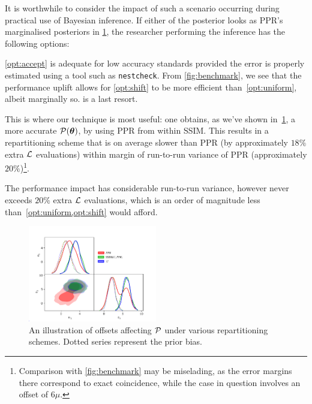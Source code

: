 \documentclass[usenatbib]{mnras}
\begin{document}
It is worthwhile to consider the impact of such a scenario occurring
during practical use of Bayesian inference. If either of the posterior
looks as PPR's marginalised posteriors in \cref{fig:convergence}, the
researcher performing the inference has the following options:
\vref{opt:accept} is adequate for low accuracy standards provided the
error is properly estimated using a tool such as \texttt{nestcheck}.
From \cref{fig:benchmark}, we see that the performance uplift allows
for \cref{opt:shift} to be more efficient than~\ref{opt:uniform},
albeit marginally so.  is a last resort.

This is where our technique is most useful: one obtains, as we've
shown in~\cref{fig:convergence}, a more accurate
\({\cal P}(\bm{\theta})\), by using PPR from within SSIM. This results
in a repartitioning scheme that is on average slower than PPR (by
approximately \(18\%\) extra \({\cal L}\) evaluations) within margin
of run-to-run variance of PPR (approximately
\(20\%\))\footnote{Comparison with \cref{fig:benchmark} may be
  miselading, as the error margins there correspond to exact
  coincidence, while the case in question involves an offset of
  $6\mu$. }.

The
performance impact has considerable run-to-run variance, however never
exceeds \(20\%\) extra \({\cal L}\) evaluations, which is an order of
magnitude less than~\vref{opt:uniform,opt:shift} would afford.

\begin{figure}
\includegraphics[width=0.5\textwidth]{./illustrations/convergence.pdf}
\caption{An illustration of offsets affecting ${\cal P}$ under various
  repartitioning schemes. Dotted series represent the prior
  bias. \label{fig:convergence}}
\end{figure}
\end{document}
